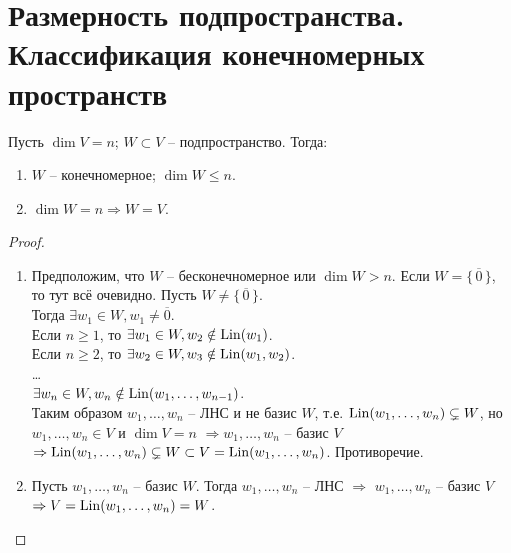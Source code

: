 
\section{Размерность подпространства. Классификация конечномерных пространств}

\begin{theorem-non}
\end{theorem-non}
Пусть $\dim V = n$; $W \subset V$ -- подпространство. Тогда:
\begin{enumerate}
    \item $W$ -- конечномерное; $\dim W \leq n$.
    \item $\dim W = n \Rightarrow W = V$.
\end{enumerate}
\begin{proof} $ $

    \begin{enumerate}
        \item Предположим, что $W$ -- бесконечномерное или $\dim W > n$.
        Если $W = \{\,\overline{0}\,\}$, то тут всё очевидно. 
        Пусть $W \neq \{\,\overline{0}\,\}$. \\
        Тогда $\exists w_1 \in W, w_1 \neq \overline{0}$. \\
        Если $n \geqslant 1$, то $\exists w_1 \in W, 
        w_2 \notin \operatorname{Lin}(w_1)$.\\
        Если $n \geqslant 2$, то $\exists w_2 \in W, 
        w_3 \notin \operatorname{Lin}(w_1, w_2)$.\\
        \dots\\
        $\exists w_n \in W, 
        w_n \notin \operatorname{Lin}(w_1, \dots, w_{n-1})$.\\
        Таким образом $w_1, \dots, w_n$ -- ЛНС и не базис $W$,
        т.е. $\operatorname{Lin}(w_1, \dots, w_n) \subsetneq W$, но
        $w_1, \dots, w_n \in V$ и $\dim V = n$ $\Rightarrow
        w_1, \dots, w_n$ -- базис $V$ $\Rightarrow
        \operatorname{Lin}(w_1, \dots, w_n) \subsetneq W \subset V = 
        \operatorname{Lin}(w_1, \dots, w_n)$. Противоречие.

        \item Пусть $w_1, \dots, w_n$ -- базис $W$. Тогда
        $w_1, \dots, w_n$ -- ЛНС $\Rightarrow$ $w_1, \dots, w_n$ --
        базис $V$ $\Rightarrow V = \operatorname{Lin}(w_1, \dots, w_n) = W$.
    \end{enumerate}
\end{proof}

